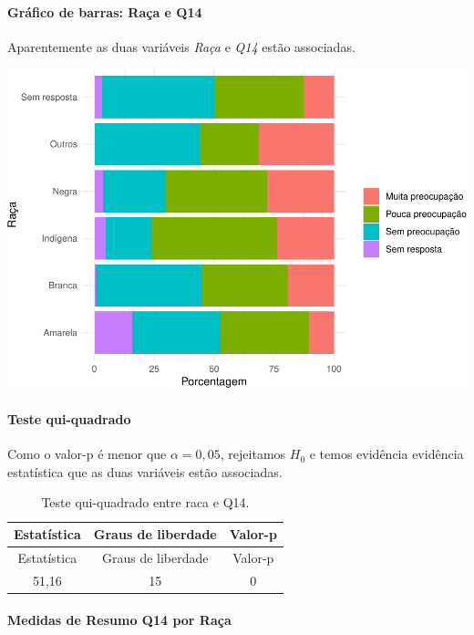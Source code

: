 \documentclass[]{article}
\let\oldparagraph\paragraph
\renewcommand{\paragraph}[1]{\oldparagraph{#1}\mbox{}}
\begin{document}
\hypertarget{gruxe1fico-de-barras-rauxe7a-e-q14}{%
\paragraph{Gráfico de barras: Raça e Q14}\label{gruxe1fico-de-barras-rauxe7a-e-q14}}

Aparentemente as duas variáveis \emph{Raça} e \emph{Q14} estão associadas.

\begin{center}\includegraphics[width=0.75\linewidth]{relatorio_files/figure-latex/unnamed-chunk-82-1} \end{center}

\hypertarget{teste-qui-quadrado-5}{%
\paragraph{Teste qui-quadrado}\label{teste-qui-quadrado-5}}

Como o valor-p é menor que \(\alpha=0,05\), rejeitamos \(H_0\) e temos evidência evidência estatística que as duas variáveis estão associadas.

\begin{longtable}[]{@{}ccc@{}}
\caption{\label{tab:unnamed-chunk-83}Teste qui-quadrado entre raca e Q14.}\tabularnewline
\toprule
Estatística & Graus de liberdade & Valor-p\tabularnewline
\midrule
\endfirsthead
\toprule
Estatística & Graus de liberdade & Valor-p\tabularnewline
\midrule
\endhead
51,16 & 15 & 0\tabularnewline
\bottomrule
\end{longtable}

\cleardoublepage

\hypertarget{medidas-de-resumo-q14-por-rauxe7a}{%
\paragraph{Medidas de Resumo Q14 por Raça}\label{medidas-de-resumo-q14-por-rauxe7a}}
\end{document}
